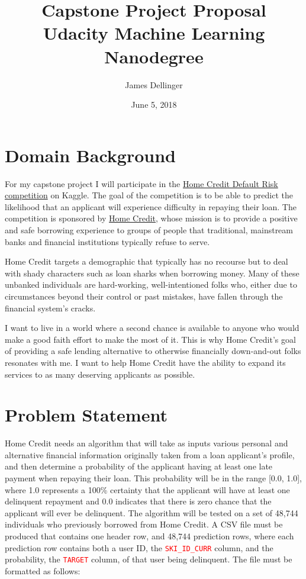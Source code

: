 \documentclass[12pt, letterpaper]{article}
\title{Capstone Project Proposal\\[8pt]
\normalsize{Udacity Machine Learning Nanodegree}}
\date{June 5, 2018}
\author{James Dellinger}
\begin{document}
\maketitle

\section{Domain Background}
For my capstone project I will participate in the \href{https://www.kaggle.com/c/home-credit-default-risk}{Home Credit Default Risk competition} on Kaggle\cite{kagglehomecreditcompetitionoverview}. The goal of the competition is to be able to predict the likelihood that an applicant will experience difficulty in repaying their loan. The competition is sponsored by \href{http://www.homecredit.net}{Home Credit}\cite{homecreditwebsite}, whose mission is to provide a positive and safe borrowing experience to groups of people that traditional, mainstream banks and financial institutions typically refuse to serve.

Home Credit targets a demographic that typically has no recourse but to deal with shady characters such as loan sharks when borrowing money. Many of these unbanked individuals are hard-working, well-intentioned folks who, either due to circumstances beyond their control or past mistakes, have fallen through the financial system’s cracks.

I want to live in a world where a second chance is available to anyone who would make a good faith effort to make the most of it. This is why Home Credit’s goal of providing a safe lending alternative to otherwise financially down-and-out folks resonates with me. I want to help Home Credit have the ability to expand its services to as many deserving applicants as possible.

\section{Problem Statement}
\label{problemstatement}
Home Credit needs an algorithm that will take as inputs various personal and alternative financial information originally taken from a loan applicant's profile, and then determine a probability of the applicant having at least one late payment when repaying their loan. This probability will be in the range [0.0, 1.0], where 1.0 represents a 100\% certainty that the applicant will have at least one delinquent repayment and 0.0 indicates that there is zero chance that the applicant will ever be delinquent. The algorithm will be tested on a set of 48,744 individuals who previously borrowed from Home Credit. A CSV file must be produced that contains one header row, and 48,744 prediction rows, where each prediction row contains both a user ID, the \colorbox{backcolor}{\textcolor{red}{\texttt{SKI_ID_CURR}}} column, and the probability, the \colorbox{backcolor}{\textcolor{red}{\texttt{TARGET}}} column, of that user being delinquent. The file must be formatted as follows:
\end{document}
